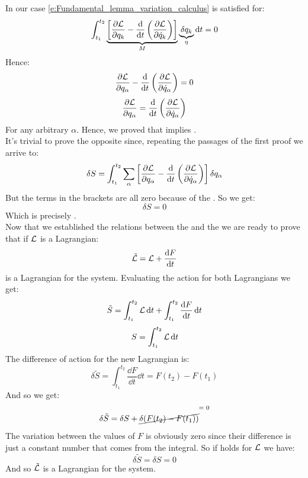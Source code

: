 In our case \eqref{e:Fundamental_lemma_variation_calculus} is satisfied for:
\begin{equation}
    \int_{t_1}^{t_2}\underbrace{\left[\dfrac{\partial \lagr}{\partial q_{k}} - \dv{}{t}\brackets{\dfrac{\partial \lagr}{\partial \dot{q}_{k}}}\right]}_{M} \underbrace{\delta q_{k}}_{\eta} \dd{t} = 0
\end{equation}
Hence:
\begin{equation}
    \pdv{\lagr}{q_{\alpha}} - \dv{}{t}\brackets{\pdv{\lagr}{\dot{q}_{\alpha}}} = 0
\end{equation}
\begin{equation}
    \pdv{\lagr}{q_{\alpha}} = \dv{}{t}\brackets{\pdv{\lagr}{\dot{q}_{\alpha}}}
\end{equation}
For any arbitrary $\alpha$. Hence, we proved that \hpquotemath\;implies \eleref.\\
It's trivial to prove the opposite since, repeating the passages of the first proof we arrive to:
\begin{equation}
    \delta S = \int_{t_1}^{t_2}\bigsum_{\alpha}\left[\pdv{\lagr}{q_{\alpha}} - \dv{}{t}\brackets{\pdv{\lagr}{\dot{q}_{\alpha}}}\right] \delta q_{\alpha}
\end{equation}
But the terms in the brackets are all zero because of the \eleref. So we get:
\begin{equation}
    \delta S = 0
\end{equation}
Which is precisely \hpquotemath.\\
Now that we established the relations between the \eleref\;and the \hpquotemath\;we are ready to prove that if $\mathcal{L}$ is a Lagrangian:
\begin{equation}
    \tilde{\mathcal{L}} = \mathcal{L} + \dfrac{\dd{F}}{\dd{t}}
\end{equation}
is a Lagrangian for the system. Evaluating the action for both Lagrangians we get:
\begin{equation}
    \tilde{S} = \int_{t_1}^{t_2}\mathcal{L} \dd{t} + \int_{t_1}^{t_2}\dfrac{\dd{F}}{\dd{t}} \dd{t}
\end{equation}
\begin{equation}
    S = \int_{t_1}^{t_2}\mathcal{L} \dd{t}
\end{equation}
The difference of action for the new Lagrangian is:
\begin{equation}
    \delta \tilde{S} = \int_{t_1}^{t_2}\dfrac{\dd{F}}{\dd{t}} \dd{t} = F(t_2) - F(t_1)
\end{equation}
And so we get:
\begin{equation}
    \delta \tilde{S} = \delta S + \crossout{\delta(F(t_2) - F(t_1))}
\end{equation}
The variation between the values of $F$ is obviously zero since their difference is just a constant number that comes from the integral. So if \hpquotemath\;holds for $\mathcal{L}$ we have:
\begin{equation}
    \delta \tilde{S} = \delta S = 0
\end{equation}
And so $\tilde{\mathcal{L}}$ is a Lagrangian for the system.\\
